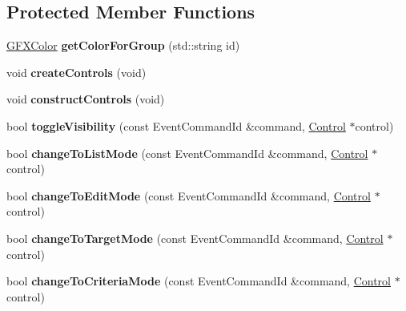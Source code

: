 \subsection*{Protected Member Functions}
\begin{DoxyCompactItemize}
\item 
\hyperlink{structGFXColor}{G\+F\+X\+Color} {\bfseries get\+Color\+For\+Group} (std\+::string id)\hypertarget{classNavComputer_ad21250cc40795edc3b70071245d0571b}{}\label{classNavComputer_ad21250cc40795edc3b70071245d0571b}

\item 
void {\bfseries create\+Controls} (void)\hypertarget{classNavComputer_aacd4306672132991bc99692529fd92ee}{}\label{classNavComputer_aacd4306672132991bc99692529fd92ee}

\item 
void {\bfseries construct\+Controls} (void)\hypertarget{classNavComputer_a01501661a3e6087f50c67a1dd26429c8}{}\label{classNavComputer_a01501661a3e6087f50c67a1dd26429c8}

\item 
bool {\bfseries toggle\+Visibility} (const Event\+Command\+Id \&command, \hyperlink{classControl}{Control} $\ast$control)\hypertarget{classNavComputer_ad71cca7e036d5b809a53b76cd1b68b46}{}\label{classNavComputer_ad71cca7e036d5b809a53b76cd1b68b46}

\item 
bool {\bfseries change\+To\+List\+Mode} (const Event\+Command\+Id \&command, \hyperlink{classControl}{Control} $\ast$control)\hypertarget{classNavComputer_a12be3059a1fb51a8dd53cceb8b1e86eb}{}\label{classNavComputer_a12be3059a1fb51a8dd53cceb8b1e86eb}

\item 
bool {\bfseries change\+To\+Edit\+Mode} (const Event\+Command\+Id \&command, \hyperlink{classControl}{Control} $\ast$control)\hypertarget{classNavComputer_a398e29a4743d284517d8f6463e0dfa2a}{}\label{classNavComputer_a398e29a4743d284517d8f6463e0dfa2a}

\item 
bool {\bfseries change\+To\+Target\+Mode} (const Event\+Command\+Id \&command, \hyperlink{classControl}{Control} $\ast$control)\hypertarget{classNavComputer_a376db1d050d9f4bfbd313dbf7bbe3378}{}\label{classNavComputer_a376db1d050d9f4bfbd313dbf7bbe3378}

\item 
bool {\bfseries change\+To\+Criteria\+Mode} (const Event\+Command\+Id \&command, \hyperlink{classControl}{Control} $\ast$control)\hypertarget{classNavComputer_a373944b38994e8e34286b510d7823e06}{}\label{classNavComputer_a373944b38994e8e34286b510d7823e06}


\end{DoxyCompactItemize}
